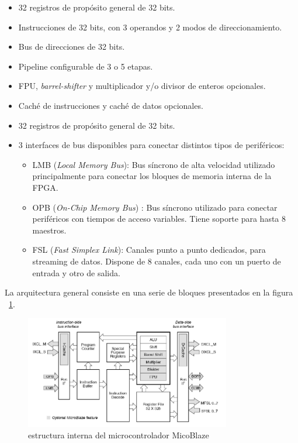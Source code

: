 	\begin{itemize}
	  \item  32 registros de propósito general de 32 bits.
	  \item  Instrucciones de 32 bits, con 3 operandos y 2 modos de direccionamiento.
	  \item  Bus de direcciones de 32 bits.
	  \item  Pipeline configurable de 3 o 5 etapas.
	  \item  FPU,\textit{ barrel-shifter} y multiplicador y/o divisor de enteros opcionales.
	  \item  Caché de instrucciones y caché de datos opcionales.
	  \item  32 registros de propósito general de 32 bits.
	  \item   3 interfaces de bus disponibles para conectar distintos tipos de periféricos:
		\begin{itemize}
		  \item  LMB \cite{Etiqueta23}(\textit{Local Memory Bus}): Bus síncrono de alta velocidad utilizado principalmente para conectar los bloques de memoria interna de la FPGA.
	 	 \item  OPB \cite{Etiqueta24}(\textit{On-Chip Memory Bus}) : Bus síncrono utilizado para conectar periféricos con tiempos de acceso variables. Tiene soporte para hasta 8 maestros.
	 	 \item FSL\cite{Etiqueta25} (\textit{Fast Simplex Link}): Canales punto a punto dedicados, para streaming de datos. Dispone de 8 canales, cada uno con un puerto de entrada y otro de salida.
		\end{itemize}
	\end{itemize}

La arquitectura general consiste en una serie de bloques presentados en la figura ~\ref{fig:MicoBlazer}.
		
	\begin{figure}[h!]
 	\begin{center}
  	\includegraphics[width=0.8\textwidth,keepaspectratio=true]{./images/estructuramicroblazer}
  	\caption{estructura interna del microcontrolador MicoBlaze}
  	\label{fig:MicoBlazer}
 	\end{center}
	\end{figure}


